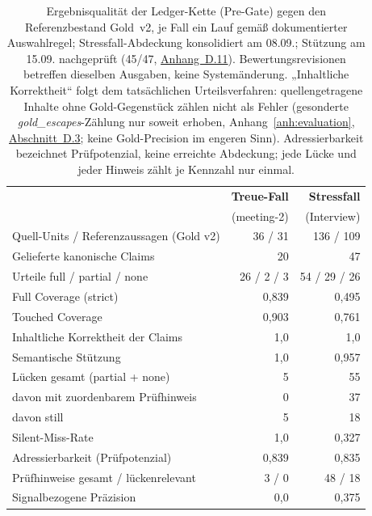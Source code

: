 \begin{table}[htbp]
  \centering
  \small
  \begin{tabular}{>{\raggedright\arraybackslash}p{}rr}
    \hline
    & \textbf{Treue-Fall} & \textbf{Stressfall} \\
    & (meeting-2) & (Interview) \\
    \hline
    Quell-Units / Referenzaussagen (Gold v2) & 36 / 31 & 136 / 109 \\
    Gelieferte kanonische Claims & 20 & 47 \\
    Urteile full / partial / none & 26 / 2 / 3 & 54 / 29 / 26 \\
    \hline
    Full Coverage (strict) & 0{,}839 & 0{,}495 \\
    Touched Coverage & 0{,}903 & 0{,}761 \\
    Inhaltliche Korrektheit der Claims & 1{,}0 & 1{,}0 \\
    Semantische Stützung & 1{,}0 & 0{,}957 \\
    \hline
    Lücken gesamt (partial + none) & 5 & 55 \\
    \quad davon mit zuordenbarem Prüfhinweis & 0 & 37 \\
    \quad davon still & 5 & 18 \\
    Silent-Miss-Rate & 1{,}0 & 0{,}327 \\
    Adressierbarkeit (Prüfpotenzial) & 0{,}839 & 0{,}835 \\
    Prüfhinweise gesamt / lückenrelevant & 3 / 0 & 48 / 18 \\
    Signalbezogene Präzision & 0{,}0 & 0{,}375 \\
    \hline
  \end{tabular}
  \caption[Ergebnisqualität der Ledger-Kette vor dem Human-Gate]{Ergebnisqualität der Ledger-Kette (Pre-Gate) gegen den
    Referenzbestand Gold~v2, je Fall ein Lauf gemäß
    dokumentierter Auswahlregel;
    Stressfall-Abdeckung konsolidiert am 08.09.; Stützung am
    15.09. nachgeprüft (45/47, \hyperref[anh:ledger-wiederholungen]{Anhang~D.11}).
    Bewertungsrevisionen betreffen dieselben Ausgaben, keine
    Systemänderung. „Inhaltliche
    Korrektheit`` folgt dem tatsächlichen Urteilsverfahren:
    quellengetragene Inhalte ohne Gold-Gegenstück zählen nicht als
    Fehler (gesonderte \emph{gold\_escapes}-Zählung nur soweit
    erhoben, Anhang~\ref{anh:evaluation}, \hyperref[anh:referenzpruefung]{Abschnitt~D.3}; keine Gold-Precision im engeren Sinn). Adressierbarkeit
    bezeichnet Prüfpotenzial, keine erreichte Abdeckung; jede Lücke
    und jeder Hinweis zählt je Kennzahl nur einmal.}
  \label{t:eval-kernzahlen-v2}
\end{table}
